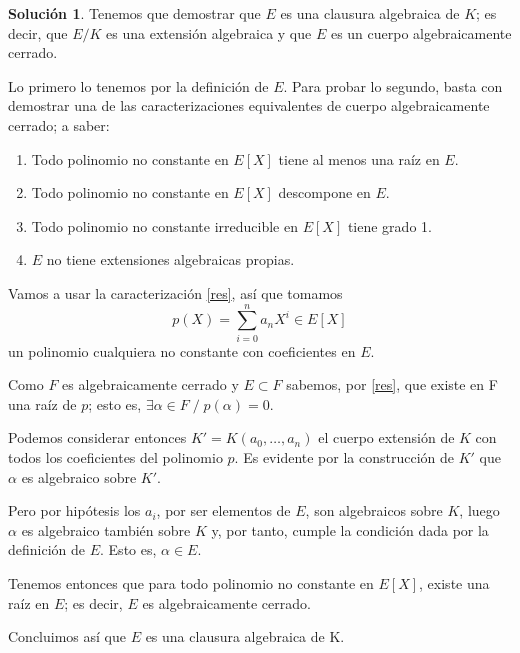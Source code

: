 \documentclass[a4paper, 11pt]{article}
\theoremstyle{definition}
\newtheorem*{solucion}{Solución}
\theoremstyle{remark}
\begin{document}
  \begin{solucion}
      Tenemos que demostrar que $E$ es una clausura algebraica de $K$; es decir, que $E/K$ es una extensión algebraica y que $E$ es un cuerpo algebraicamente cerrado.

      Lo primero lo tenemos por la definición de $E$. Para probar lo segundo, basta con demostrar una de las caracterizaciones equivalentes de cuerpo algebraicamente cerrado; a saber:
      \begin{enumerate}
          \item \label{res} Todo polinomio no constante en $E[X]$ tiene al menos una raíz en $E$.
          \item Todo polinomio no constante en $E[X]$ descompone en $E$.
          \item Todo polinomio no constante irreducible en $E[X]$ tiene grado 1.
          \item $E$ no tiene extensiones algebraicas propias.
      \end{enumerate}

      Vamos a usar la caracterización \ref{res}, así que tomamos
      \[
      p(X) = \sum_{i=0}^n a_n X^i \in E[X]
      \]
      un polinomio cualquiera no constante con coeficientes en $E$.

      Como $F$ es algebraicamente cerrado y $E\subset F$ sabemos, por \ref{res}, que existe en F una raíz de $p$; esto es, $\exists\alpha\in F \;/\; p(\alpha)=0$.

      Podemos considerar entonces $K'=K(a_0,\dots,a_n)$ el cuerpo extensión de $K$ con todos los coeficientes del polinomio $p$. Es evidente por la construcción de $K'$ que $\alpha$ es algebraico sobre $K'$.

      Pero por hipótesis los $a_i$, por ser elementos de $E$, son algebraicos sobre $K$, luego $\alpha$ es algebraico también sobre $K$ y, por tanto, cumple la condición dada por la definición de $E$. Esto es, $\alpha\in E$.

      Tenemos entonces que para todo polinomio no constante en $E[X]$, existe una raíz en $E$; es decir, $E$ es algebraicamente cerrado.

      Concluimos así que $E$ es una clausura algebraica de K.
  \end{solucion}
\end{document}
